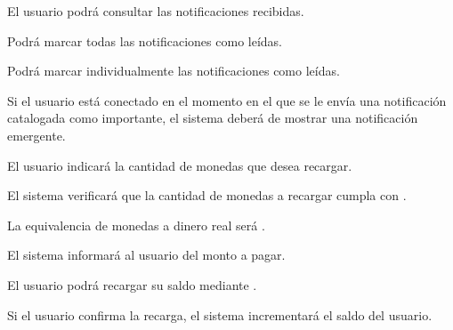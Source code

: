 \begin{RFUsuarioAutenticado}
    \item El usuario podrá consultar las notificaciones recibidas.
     \begin{RFUsuarioAutenticado}
        \item Podrá marcar todas las notificaciones como leídas.
        \item Podrá marcar individualmente las notificaciones como leídas.
    \end{RFUsuarioAutenticado}
    \item Si el usuario está conectado en el momento en el que se le envía una notificación catalogada como importante, el sistema deberá de mostrar una notificación emergente.
    \begin{RFUsuarioAutenticado}
        \item El usuario indicará la cantidad de monedas que desea recargar.
        \item El sistema verificará que la cantidad de monedas a recargar cumpla con .
        \item La equivalencia de monedas a dinero real será .
        \item El sistema informará al usuario del monto a pagar.
        \item El usuario podrá recargar su saldo mediante .
        \item Si el usuario confirma la recarga, el sistema incrementará el saldo del usuario.
    \end{RFUsuarioAutenticado}

\end{RFUsuarioAutenticado}
